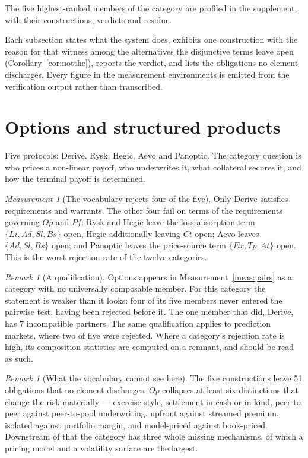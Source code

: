 \documentclass[11pt,reqno]{amsart}
\theoremstyle{plain}
\theoremstyle{definition}
\theoremstyle{remark}
\newtheorem{measurement}[theorem]{Measurement}
\newtheorem{remark}[theorem]{Remark}
\begin{document}
The five highest-ranked members of the category are profiled in the
supplement, with their constructions, verdicts and residue.

Each
subsection states what the system does, exhibits one construction with the
reason for that witness among the alternatives the disjunctive terms leave open
(Corollary~\ref{cor:notthe}), reports the verdict, and lists the obligations no
element discharges. Every figure in the measurement environments is emitted from
the verification output rather than transcribed.

\section{Options and structured products}\label{sec:cat:opt}

Five protocols: Derive, Rysk, Hegic, Aevo and Panoptic. The category question is
who prices a non-linear payoff, who underwrites it, what collateral secures it,
and how the terminal payoff is determined.

\begin{measurement}[The vocabulary rejects four of the five]\label{meas:cat:optrej}
Only Derive satisfies requirements and warrants. The other four fail on terms of
the requirements governing $Op$ and $Pf$: Rysk and Hegic leave the
loss-absorption term $\{Li,Ad,Sl,Bs\}$ open, Hegic additionally leaving $Ct$
open; Aevo leaves $\{Ad,Sl,Bs\}$ open; and Panoptic leaves the price-source
term $\{Ex,Tp,At\}$ open. This is the worst rejection rate of the twelve
categories.
\end{measurement}

\begin{remark}[A qualification]
Options appears in Measurement~\ref{meas:pairs} as a category with no
universally composable member. For this category the statement is weaker than it
looks: four of its five members never entered the pairwise test, having been
rejected before it. The one member that did, Derive, has $7$ incompatible
partners. The same qualification applies to prediction markets, where two of
five were rejected. Where a category's rejection rate is high, its composition
statistics are computed on a remnant, and should be read as such.
\end{remark}

\begin{remark}[What the vocabulary cannot see here]
The five constructions leave 51 obligations that no element discharges. $Op$ collapses
at least six distinctions that change the risk materially --- exercise style,
settlement in cash or in kind, peer-to-peer against peer-to-pool underwriting,
upfront against streamed premium, isolated against portfolio margin, and
model-priced against book-priced. Downstream of that the category has three
whole missing mechanisms, of which a pricing model and a volatility surface are
the largest.
\end{remark}
\end{document}
